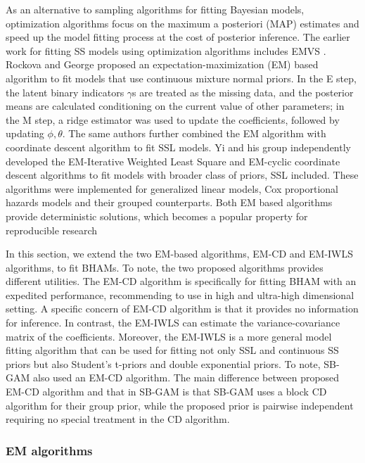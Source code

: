 \documentclass[AMA,STIX1COL,]{WileyNJD-v2}
\begin{document}
As an alternative to sampling algorithms for fitting Bayesian models,
optimization algorithms focus on the maximum a posteriori (MAP)
estimates and speed up the model fitting process at the cost of
posterior inference. The earlier work for fitting SS models using
optimization algorithms includes EMVS \citep{Rockova2014a}. Rockova and
George\citep{Rockova2014a} proposed an expectation-maximization (EM)
based algorithm to fit models that use continuous mixture normal priors.
In the E step, the latent binary indicators \(\gamma\)s are treated as
the missing data, and the posterior means are calculated conditioning on
the current value of other parameters; in the M step, a ridge estimator
was used to update the coefficients, followed by updating
\(\phi, \theta\). The same authors \citep{Rockova2018b, Rockova2018}
further combined the EM algorithm with coordinate descent algorithm to
fit SSL models. Yi and his group independently developed the
EM-Iterative Weighted Least Square and EM-cyclic coordinate descent
algorithms to fit models with broader class of priors, SSL
included.\citep{Yi2019} These algorithms were implemented for
generalized linear models\citep{Tang2017a}, Cox proportional hazards
models \citep{Tang2017} and their grouped
counterparts\citep{Tang2018, Tang2019}. Both EM based algorithms provide
deterministic solutions, which becomes a popular property for
reproducible research

In this section, we extend the two EM-based algorithms, EM-CD and
EM-IWLS algorithms, to fit BHAMs. To note, the two proposed algorithms
provides different utilities. The EM-CD algorithm is specifically for
fitting BHAM with an expedited performance, recommending to use in high
and ultra-high dimensional setting. A specific concern of EM-CD
algorithm is that it provides no information for inference. In contrast,
the EM-IWLS can estimate the variance-covariance matrix of the
coefficients. Moreover, the EM-IWLS is a more general model fitting
algorithm that can be used for fitting not only SSL and continuous SS
priors but also Student's t-priors and double exponential priors. To
note, SB-GAM\citep{Bai2020, Bai2021} also used an EM-CD algorithm. The
main difference between proposed EM-CD algorithm and that in SB-GAM is
that SB-GAM uses a block CD algorithm for their group prior, while the
proposed prior is pairwise independent requiring no special treatment in
the CD algorithm.

\hypertarget{em-algorithms}{%
\subsubsection{EM algorithms}\label{em-algorithms}}
\end{document}

